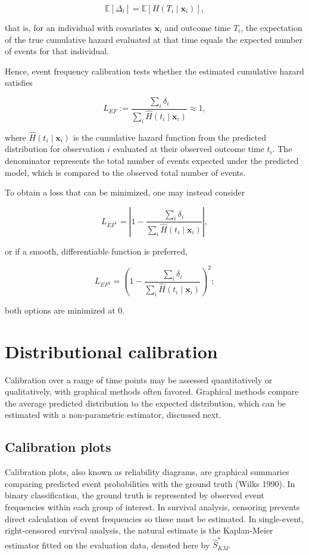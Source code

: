 \documentclass[
  letterpaper,
  krantz2]{style/krantz}
\begin{document}
\[
\mathbb{E}[\Delta_i] = \mathbb{E}[H(T_i \mid \mathbf{x}_i)],
\]

that is, for an individual with covariates \(\mathbf{x}_i\) and outcome
time \(T_i\), the expectation of the true cumulative
hazard evaluated at that time equals
the expected number of events for that individual.

Hence, event frequency calibration tests whether the estimated
cumulative hazard satisfies

\[
L_{EF} := \frac{\sum_i \delta_i}{\sum_i \hat{H}(t_i \mid \mathbf{x}_i)} \approx 1,
\]

where \(\hat{H}(t_i \mid \mathbf{x}_i)\) is the cumulative hazard
function from the predicted distribution for observation \(i\) evaluated
at their observed outcome time \(t_i\). The denominator represents the
total number of events expected under the predicted model, which is
compared to the observed total number of events.

To obtain a loss that can be minimized, one may instead consider

\[
L_{EF^1} = \left\lvert 1 - \frac{\sum_i \delta_i}{\sum_i \hat{H}(t_i \mid \mathbf{x}_i)} \right\rvert,
\]

or if a smooth, differentiable function is preferred,

\[
L_{EF^2} = \left(1 - \frac{\sum_i \delta_i}{\sum_i \hat{H}(t_i \mid \mathbf{x}_i)}\right)^2;
\]

both options are minimized at \(0\).

\section{Distributional calibration}\label{sec-calib-prob}

Calibration over a range of time points may be assessed quantitatively
or qualitatively, with graphical methods often favored. Graphical
methods compare the average predicted distribution to the expected
distribution, which can be estimated with a non-parametric estimator,
discussed next.

\subsection{Calibration plots}\label{sec-calib-km}

Calibration plots, also known as reliability
diagrams, are graphical summaries comparing predicted event
probabilities with the ground truth (Wilks 1990). In binary
classification, the ground truth is represented by observed event
frequencies within each group of interest. In survival analysis,
censoring prevents direct calculation of event frequencies so these must
be estimated. In single-event, right-censored survival analysis, the
natural estimate is the Kaplan-Meier estimator fitted on the evaluation
data, denoted here by
\(\hat{S}^*_{KM}\).
\end{document}
